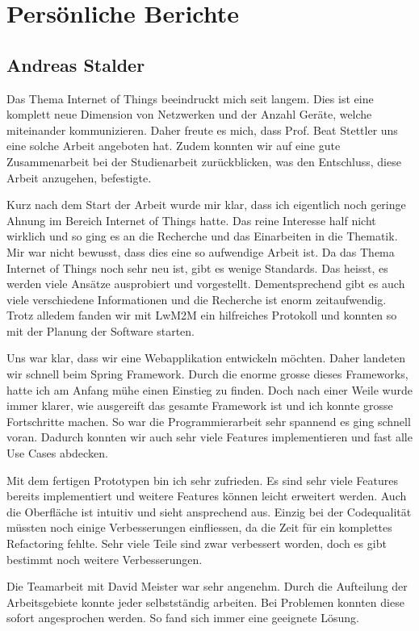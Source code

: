 \chapter{Persönliche Berichte}

\section{Andreas Stalder}
Das Thema Internet of Things beeindruckt mich seit langem. Dies ist eine komplett neue Dimension von Netzwerken und der Anzahl Geräte, welche miteinander kommunizieren. Daher freute es mich, dass Prof. Beat Stettler uns eine solche Arbeit angeboten hat. Zudem konnten wir auf eine gute Zusammenarbeit bei der Studienarbeit zurückblicken, was den Entschluss, diese Arbeit anzugehen, befestigte.

Kurz nach dem Start der Arbeit wurde mir klar, dass ich eigentlich noch geringe Ahnung im Bereich Internet of Things hatte. Das reine Interesse half nicht wirklich und so ging es an die Recherche und das Einarbeiten in die Thematik. Mir war nicht bewusst, dass dies eine so aufwendige Arbeit ist. Da das Thema Internet of Things noch sehr neu ist, gibt es wenige Standards. Das heisst, es werden viele Ansätze ausprobiert und vorgestellt. Dementsprechend gibt es auch viele verschiedene Informationen und die Recherche ist enorm zeitaufwendig. Trotz alledem fanden wir mit LwM2M ein hilfreiches Protokoll und konnten so mit der Planung der Software starten.

Uns war klar, dass wir eine Webapplikation entwickeln möchten. Daher landeten wir schnell beim Spring Framework. Durch die enorme grosse dieses Frameworks, hatte ich am Anfang mühe einen Einstieg zu finden. Doch nach einer Weile wurde immer klarer, wie ausgereift das gesamte Framework ist und ich konnte grosse Fortschritte machen. So war die Programmierarbeit sehr spannend es ging schnell voran. Dadurch konnten wir auch sehr viele Features implementieren und fast alle Use Cases abdecken.

Mit dem fertigen Prototypen bin ich sehr zufrieden. Es sind sehr viele Features bereits implementiert und weitere Features können leicht erweitert werden. Auch die Oberfläche ist intuitiv und sieht ansprechend aus. Einzig bei der Codequalität müssten noch einige Verbesserungen einfliessen, da die Zeit für ein komplettes Refactoring fehlte. Sehr viele Teile sind zwar verbessert worden, doch es gibt bestimmt noch weitere Verbesserungen.

Die Teamarbeit mit David Meister war sehr angenehm. Durch die Aufteilung der Arbeitsgebiete konnte jeder selbstständig arbeiten. Bei Problemen konnten diese sofort angesprochen werden. So fand sich immer eine geeignete Lösung.

